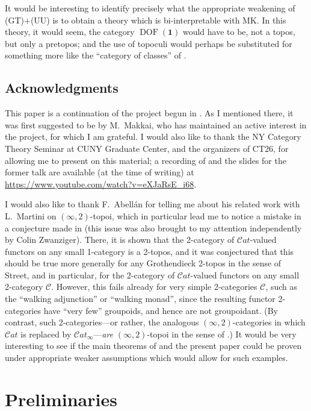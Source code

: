 \documentclass{amsart}
\newcommand\Cat{\mathcal{C}at}
\newcommand\cC{\mathcal{C}}
\newcommand\DOF{\operatorname{DOF}}
\newcommand\tm{\mathbf{1}}
\theoremstyle{definition}
\theoremstyle{remark}
\theoremstyle{plainwithref}
\begin{document}
It would be interesting to identify precisely what the appropriate weakening of (GT)+(UU) is to obtain a theory which is bi-interpretable with MK.
In this theory, it would seem, the category \( \DOF(\tm) \) would have to be, not a topos, but only a pretopos; and the use of topoculi would perhaps be substituted for something more like the ``category of classes'' of \cite{joyal-moerdijk-ast}.

\subsection{Acknowledgments}
This paper is a continuation of the project begun in \cite{helfer-topoi-in-topoi}.
As I mentioned there, it was first suggested to be by M.~Makkai, who has maintained an active interest in the project, for which I am grateful.
I would also like to thank the NY Category Theory Seminar at CUNY Graduate Center, and the organizers of CT26, for allowing me to present on this material; a recording of and the slides for the former talk are available (at the time of writing) at \url{https://www.youtube.com/watch?v=eXJaRsE_i68}.

I would also like to thank F.~Abellán for telling me about his related work \cite{abellan-martini-2-topoi} with L.~Martini on \( (\infty,2) \)-topoi, which in particular lead me to notice a mistake in a conjecture made in \cite[\S7]{helfer-topoi-in-topoi} (this issue was also brought to my attention independently by Colin Zwanziger).
There, it is shown that the 2-category of \( \Cat \)-valued functors on any small 1-category is a 2-topos, and it was conjectured that this should be true more generally for any Grothendieck 2-topos in the sense of Street, and in particular, for the 2-category of \( \Cat \)-valued functors on any small 2-category \( \cC \).
However, this fails already for very simple 2-categories \( \cC \), such as the ``walking adjunction'' or ``walking monad'', since the resulting functor 2-categories have ``very few'' groupoids, and hence are not groupoidant.
(By contrast, such 2-categories---or rather, the analogous \( (\infty,2) \)-categories in which \( \Cat \) is replaced by \( \Cat_\infty \)---\emph{are} \( (\infty,2) \)-topoi in the sense of \cite{abellan-martini-2-topoi}.)
It would be very interesting to see if the main theorems of \cite{helfer-topoi-in-topoi} and the present paper could be proven under appropriate weaker assumptions which would allow for such examples.

\section{Preliminaries}
\end{document}
